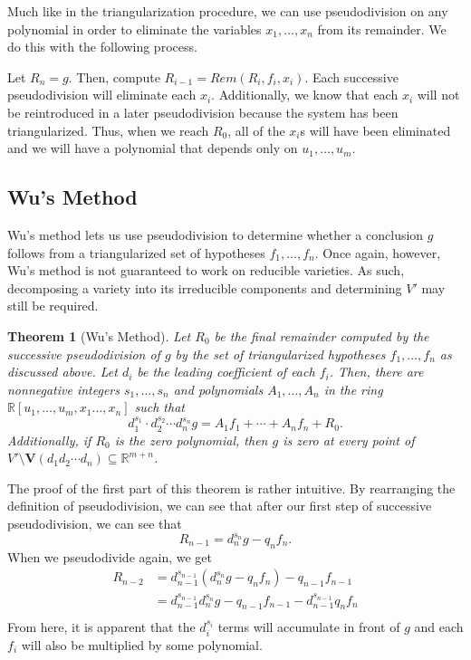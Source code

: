 \documentclass{article}
\theoremstyle{plain}
\newtheorem{Theorem}{Theorem}
\theoremstyle{definition}
\theoremstyle{remark}
\begin{document}
Much like in the triangularization procedure, we can use pseudodivision on any polynomial in order to eliminate the variables $x_1,\dots,x_n$ from its remainder.
We do this with the following process.

Let $R_n = g$. Then, compute $R_{i-1} = Rem(R_i,f_i,x_i)$. Each successive pseudodivision will eliminate each $x_i$. 
Additionally, we know that each $x_i$ will not be reintroduced in a later pseudodivision because the system has been triangularized.
Thus, when we reach $R_0$, all of the $x_i$s will have been eliminated and we will have a polynomial that depends only on $u_1,\dots,u_m$.


\subsection{Wu's Method}
Wu's method lets us use pseudodivision to determine whether a conclusion $g$ follows from a triangularized set of hypotheses $f_1,\dots,f_n$.
Once again, however, Wu's method is not guaranteed to work on reducible varieties. As such, decomposing a variety into its irreducible components and determining $V'$ may still be required.
\begin{Theorem}[Wu's Method]
    Let $R_0$ be the final remainder computed by the successive pseudodivision of $g$ by the set of triangularized hypotheses $f_1,\dots,f_n$ as discussed above.
    Let $d_i$ be the leading coefficient of each $f_i$. 
    Then, there are nonnegative integers $s_1,\dots,s_n$ and polynomials $A_1,\dots,A_n$ in the ring $\mathbb{R}[u_1,\dots,u_m,x_1\dots,x_n]$ such that
    $$d_{1}^{s_1}\cdot d_2^{s_2} \cdots d_n^{s_n} g = A_1 f_1 + \cdots + A_n f_n + R_0.$$
    Additionally, if $R_0$ is the zero polynomial, then $g$ is zero at every point of $V' \setminus \textbf{V}(d_1d_2\cdots d_n) \subseteq \mathbb{R}^{m+n}$.
\end{Theorem}
The proof of the first part of this theorem is rather intuitive. 
By rearranging the definition of pseudodivision, we can see that after our first step of successive pseudodivision, we can see that $$R_{n-1} = d_n^{s_n} g - q_nf_n.$$
When we pseudodivide again, we get
\begin{align*}
    R_{n-2} & = d_{n-1}^{s_{n-1}}(d_n^{s_n} g - q_nf_n) - q_{n-1}f_{n-1}\\
            & = d_{n-1}^{s_{n-1}}d_n^{s_n} g - q_{n-1}f_{n-1} - d_{n-1}^{s_{n-1}}q_nf_n \\
\end{align*}
From here, it is apparent that the $d_i^{s_i}$ terms will accumulate in front of $g$ and each $f_i$ will also be multiplied by some polynomial.
\end{document}
